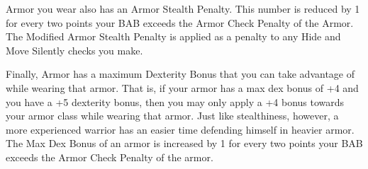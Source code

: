 Armor you wear also has an Armor Stealth Penalty. This number is reduced by 1 for every two points your BAB exceeds the Armor Check Penalty of the Armor. The Modified Armor Stealth Penalty is applied as a penalty to any Hide and Move Silently checks you make.

Finally, Armor has a maximum Dexterity Bonus that you can take advantage of while wearing that armor. That is, if your armor has a max dex bonus of +4 and you have a +5 dexterity bonus, then you may only apply a +4 bonus towards your armor class while wearing that armor. Just like stealthiness, however, a more experienced warrior has an easier time defending himself in heavier armor. The Max Dex Bonus of an armor is increased by 1 for every two points your BAB exceeds the Armor Check Penalty of the armor.

\newpage


